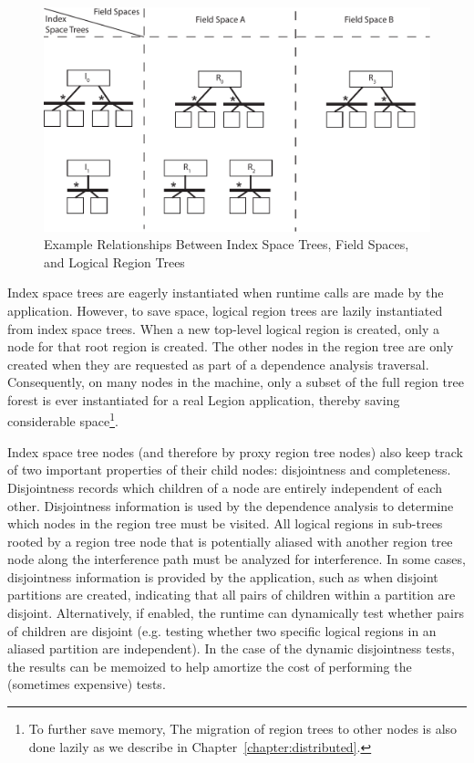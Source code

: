 \begin{figure}
\centering
\includegraphics[scale=0.7]{figs/RegionTreeForest}
\caption{Example Relationships Between Index Space Trees, 
Field Spaces, and Logical Region Trees\label{fig:regforest}} 
\end{figure}

Index space trees are eagerly instantiated when
runtime calls are made by the application.  However, 
to save space, logical region trees are lazily
instantiated from index space trees.  When a new
top-level logical region is created, only a node
for that root region is created.  The other nodes
in the region tree are only created when they are
requested as part of a dependence analysis traversal. 
Consequently, on many nodes in the machine, only a subset 
of the full region tree forest is ever instantiated for a 
real Legion application, thereby saving considerable 
space\footnote{To further save memory, The migration of region trees to other nodes 
is also done lazily as we describe in 
Chapter~\ref{chapter:distributed}.}.

Index space tree nodes (and therefore by proxy region
tree nodes) also keep track of two important properties
of their child nodes: disjointness and completeness.  
Disjointness records which children of a node are entirely
independent of each other. Disjointness information
is used by the dependence analysis to determine which
nodes in the region tree must be visited. All logical
regions in sub-trees rooted by a region tree node that
is potentially aliased with another region tree node
along the interference path must be analyzed for 
interference.  In some cases, disjointness information is 
provided by the application, such as when disjoint partitions 
are created, indicating that all pairs of children within a
partition are disjoint. Alternatively, if enabled, the runtime 
can dynamically test whether pairs of children are disjoint 
(e.g. testing  whether two specific logical regions in an 
aliased partition are independent).  In the case of the 
dynamic disjointness tests, the results can be memoized to 
help amortize the cost of performing the (sometimes 
expensive) tests.

